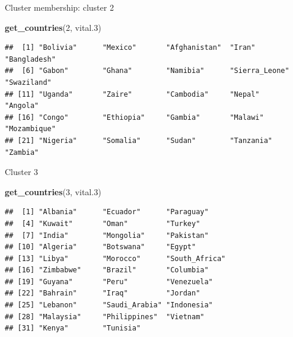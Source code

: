 \documentclass[ignorenonframetext,]{beamer}
\newenvironment{Shaded}{\begin{snugshade}}{\end{snugshade}}
\newcommand{\DecValTok}[1]{\textcolor[rgb]{0.00,0.00,0.81}{#1}}
\newcommand{\FloatTok}[1]{\textcolor[rgb]{0.00,0.00,0.81}{#1}}
\newcommand{\KeywordTok}[1]{\textcolor[rgb]{0.13,0.29,0.53}{\textbf{#1}}}
\newcommand{\NormalTok}[1]{#1}
\begin{document}
\begin{frame}[fragile]{Cluster membership: cluster 2}
\protect\hypertarget{cluster-membership-cluster-2}{}

\scriptsize

\begin{Shaded}
\begin{Highlighting}[]
\KeywordTok{get_countries}\NormalTok{(}\DecValTok{2}\NormalTok{, vital}\FloatTok{.3}\NormalTok{)}
\end{Highlighting}
\end{Shaded}

\begin{verbatim}
##  [1] "Bolivia"      "Mexico"       "Afghanistan"  "Iran"         "Bangladesh"  
##  [6] "Gabon"        "Ghana"        "Namibia"      "Sierra_Leone" "Swaziland"   
## [11] "Uganda"       "Zaire"        "Cambodia"     "Nepal"        "Angola"      
## [16] "Congo"        "Ethiopia"     "Gambia"       "Malawi"       "Mozambique"  
## [21] "Nigeria"      "Somalia"      "Sudan"        "Tanzania"     "Zambia"
\end{verbatim}

\normalsize

\end{frame}

\begin{frame}[fragile]{Cluster 3}
\protect\hypertarget{cluster-3}{}

\begin{Shaded}
\begin{Highlighting}[]
\KeywordTok{get_countries}\NormalTok{(}\DecValTok{3}\NormalTok{, vital}\FloatTok{.3}\NormalTok{)}
\end{Highlighting}
\end{Shaded}

\begin{verbatim}
##  [1] "Albania"      "Ecuador"      "Paraguay"    
##  [4] "Kuwait"       "Oman"         "Turkey"      
##  [7] "India"        "Mongolia"     "Pakistan"    
## [10] "Algeria"      "Botswana"     "Egypt"       
## [13] "Libya"        "Morocco"      "South_Africa"
## [16] "Zimbabwe"     "Brazil"       "Columbia"    
## [19] "Guyana"       "Peru"         "Venezuela"   
## [22] "Bahrain"      "Iraq"         "Jordan"      
## [25] "Lebanon"      "Saudi_Arabia" "Indonesia"   
## [28] "Malaysia"     "Philippines"  "Vietnam"     
## [31] "Kenya"        "Tunisia"
\end{verbatim}

\end{frame}
\end{document}
